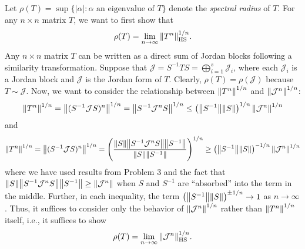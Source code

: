 \documentclass[11pt]{article}
\begin{document}
Let $\rho(T) = \sup \{|\alpha| : \alpha\text{ an eigenvalue of  } T\}$ denote the \textit{spectral radius} of $T$. For any $n\times n $ matrix $T$, we want to first show that
\begin{align*}
\rho(T) = \lim\limits_{n\to \infty} \norm{T^n}^{1/n}_{\text{HS}}.
\end{align*}
Any $n\times n$ matrix $T$ can be written as a direct sum of Jordan blocks following a similarity transformation. Suppose that $\mathcal{J} = S^{-1}TS = \bigoplus^s_{i=1}\mathcal{J}_i$, where each $\mathcal{J}_i$ is a Jordan block and $\mathcal{J}$ is the Jordan form of $T$. Clearly, $\rho(T) = \rho(\mathcal{J})$ because $T\sim \mathcal{J}$. Now, we want to consider the relationship between $\norm{T^n}^{1/n}$ and $\norm{\mathcal{J}^n}^{1/n}$:
\begin{align*}
\norm{T^n}^{1/n} = \norm{(S^{-1}\mathcal{J}S)^n}^{1/n} = \norm{ S^{-1} \mathcal{J}^n S}^{1/n} \leq \left( \norm{S^{-1}} \norm{S}\right)^{1/n} \norm{\mathcal{J}^n}^{1/n}  
\end{align*} 
and
\begin{align*}
\norm{T^n}^{1/n} = \norm{(S^{-1}\mathcal{J}S)^n}^{1/n} = \left( \frac{\norm{S}\norm{ S^{-1}\mathcal{J}^{n}S} \norm{S^{-1}}}{\norm{S} \norm{S^{-1}}}\right)^{1/n} \geq \left( \norm{S^{-1}} \norm{S}\right)^{-1/n} \norm{\mathcal{J}^n}^{1/n} 
\end{align*}
where we have used results from Problem 3 and the fact that $\norm{S}\norm{S^{-1}\mathcal{J}^nS}\norm{S^{-1}} \geq \norm{\mathcal{J}^n}$ when $S$ and $S^{-1}$ are ``absorbed'' into the term in the middle. Further, in each inequality, the term $\left( \norm{S^{-1}} \norm{S}\right)^{\pm 1/n}  \to 1 $  as $n\to \infty$. Thus, it suffices to consider only the behavior of $\norm{\mathcal{J}^n}^{1/n}$ rather than $\norm{T^n}^{1/n}$ itself, i.e., it suffices to show 
\begin{align*}
\rho(T) = \lim\limits_{n\to \infty} \norm{\mathcal{J}^n}^{1/n}_{\text{HS}}.
\end{align*}
\end{document}
